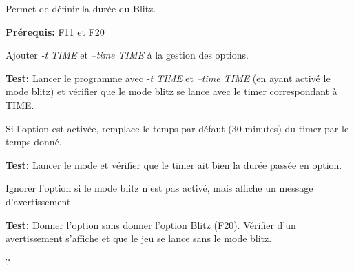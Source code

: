 \documentclass{article}
\begin{document}
\begin{needbox}
    Permet de définir la durée du Blitz.

    \textbf{Prérequis:} F11 et F20
    \begin{subneedbox}
        Ajouter \textit{-t TIME} et \textit{--time TIME} à la gestion des options.

        \textbf{Test:} Lancer le programme avec \textit{-t TIME} et \textit{--time TIME} (en ayant activé le mode blitz)
        et vérifier que le mode blitz se lance avec le timer correspondant à TIME.
    \end{subneedbox}
    \begin{subneedbox}
        Si l'option est activée, remplace le temps par défaut (30 minutes) du timer par le temps donné.

        \textbf{Test:} Lancer le mode et vérifier que le timer ait bien la durée passée en option.
    \end{subneedbox}
    \begin{subneedbox}
        Ignorer l'option si le mode blitz n'est pas activé, mais affiche un message d'avertissement

        \textbf{Test:} Donner l'option sans donner l'option Blitz (F20). Vérifier d'un avertissement s'affiche
        et que le jeu se lance sans le mode blitz.
    \end{subneedbox}
\end{needbox}

\begin{needbox}
    ?
\end{needbox}
\end{document}
